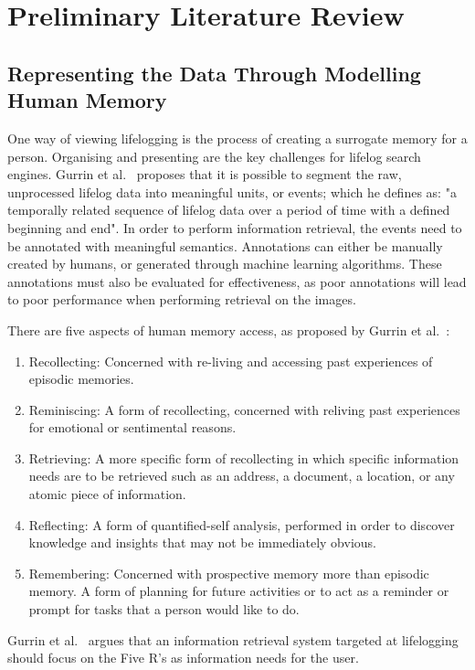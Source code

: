 \documentclass[12pt,a4paper]{article}
\begin{document}
\section{Preliminary Literature Review}
\subsection{Representing the Data Through Modelling Human Memory}
One way of viewing lifelogging is the process of creating a surrogate memory for a person. Organising and presenting are the key challenges for lifelog search engines. Gurrin et al.~\cite{gurrin2014lifelogging} proposes that it is possible to segment the raw, unprocessed lifelog data into meaningful units, or events; which he defines as: "a temporally related sequence of lifelog data over a period of time with a defined beginning and end". In order to perform information retrieval, the events need to be annotated with meaningful semantics. Annotations can either be manually created by humans, or generated through machine learning algorithms. These annotations must also be evaluated for effectiveness, as poor annotations will lead to poor performance when performing retrieval on the images.

There are five aspects of human memory access, as proposed by Gurrin et al.~\cite{gurrin2014lifelogging}:
\begin{enumerate}
    \item Recollecting: Concerned with re-living and accessing past experiences of episodic memories.
    \item Reminiscing: A form of recollecting, concerned with reliving past experiences for emotional or sentimental reasons.
    \item Retrieving: A more specific form of recollecting  in which specific information needs are to be retrieved such as an address, a document, a location, or any atomic piece of information.
    \item Reflecting: A form of quantified-self analysis, performed in order to discover knowledge and insights that may not be immediately obvious.
    \item Remembering: Concerned with prospective memory more than episodic memory. A form of planning for future activities or to act as a reminder or prompt for tasks that a person would like to do.
\end{enumerate}
Gurrin et al.~\cite{gurrin2014lifelogging} argues that an information retrieval system targeted at lifelogging should focus on the Five R's as information needs for the user.
\end{document}
